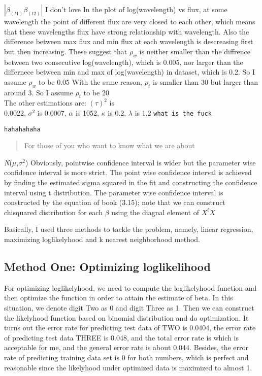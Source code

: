 \documentclass{article}\usepackage[]{graphicx}\usepackage[]{color}
\begin{document}
$|\beta_(t1)  \beta_(t2)|$ I don't love 
In the plot of log(wavelength) vs flux, at some wavelength the point of different flux are very closed to each other, which means that these wavelengths flux have strong relationship with wavelength. Also the difference between max flux and min flux at each wavelength is descreasing first but then increasing. These suggest that $\rho_{w}$ is neither smaller than the diffrence between two consecutive log(wavelength), which is 0.005, nor larger than the differnece between min and max of log(wavelength) in dataset, which is 0.2. So I assume $\rho_{w}$ to be 0.05 
With the same reason, $\rho_{t}$ is smaller than 30 but larger than around 3. So I assume $\rho_{t}$ to be 20\\
The other estimations are: $(\tau)^2$ is \\0.0022, $\sigma^2$ is 0.0007, $\alpha$ is 1052, $\kappa$ is 0.2, $\lambda$ is 1.2
\texttt{what is the fuck}
\begin{verbatim}
hahahahaha
\end{verbatim}
\begin{quote}
For those of you who want to know what we are about
\end{quote}
\emph{N}($\mu$,$\sigma^2$)
Obviously, pointwise confidence interval is wider but the parameter wise confidence interval is more strict. The point wise confidence interval is achieved by finding the estimated sigma squared in the fit and constructing the confidence interval using t distribution. The parameter wise confidence interval is constructed by the equation of book (3.15); note that we can construct chisquared distribution for each $\beta$ using the diagnal element of $X^t$$X$

Basically, I used three methods to tackle the problem, namely, linear regression, maximizing loglikelyhood and k nearest neighborhood method.
\subsection*{Method One: Optimizing loglikelihood}
For optimizing loglikelyhood, we need to compute the loglikelyhood function and then optimize the function in order to attain the estimate of beta. In this situation, we denote digit Two as 0 and digit Three as 1. Then we can construct the likelyhood function based on binomial distribution and do optimization. It turns out the error rate for predicting test data of TWO is 0.0404, the error rate of predicting test data THREE is 0.048, and the total error rate is which is acceptable for me, and the general error rate is about 0.044. Besides, the error rate of predicting training data set is 0 for both numbers, which is perfect and reasonable since the likelyhood under optimized data is maximized to almost 1. 
\end{document}
